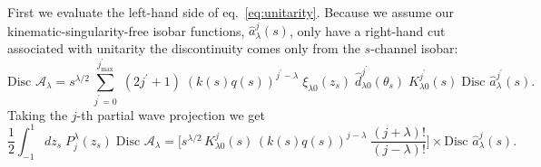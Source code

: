 \documentclass[10pt, aps,prd,amsmath,amssymb,superscriptaddress,onecolumn,
nofootinbib,showpacs,preprintnumbers]{revtex4-1}
\newcommand{\jpmax}{{j^\prime_\text{max}}}
\newcommand{\Disc}{\text{Disc }}
\begin{document}
First we evaluate the left-hand side of eq.~\ref{eq:unitarity}. Because we assume our kinematic-singularity-free isobar functions, \(\hat{a}_\lambda^j(s)\), only have a right-hand cut associated with unitarity the discontinuity comes only from the \(s\)-channel isobar:
  \begin{equation}
    \label{eq:discontinuity}
    \Disc \mathcal{A}_\lambda = s^{\lambda/2}\, \sum_{j^\prime=0}^\jpmax \; (2 j^\prime +1) \; (k(s)q(s))^{j^\prime-\lambda}  \; \xi_{\lambda 0}(z_s)
    \; \hat{d}^{j^\prime}_{\lambda 0}(\theta_s) \; K^{j^\prime}_{\lambda0}(s) \; \Disc \hat{a}_\lambda^{j^\prime}(s).
  \end{equation}
Taking the \(j\)-th partial wave projection we get
  \begin{equation}
    \label{eq:pw-disc}
    \frac{1}{2} \int_{-1}^1 dz_s \; P^\lambda_{j}(z_s) \; \Disc \mathcal{A}_\lambda =
    \bigg[ s^{\lambda/2} \, K^j_{\lambda 0}(s) \, (k(s)q(s))^{j-\lambda} \; \frac{(j+\lambda)!}{(j-
    \lambda)!} \bigg] \times \Disc \hat{a}^j_\lambda(s).
  \end{equation}
\end{document}
